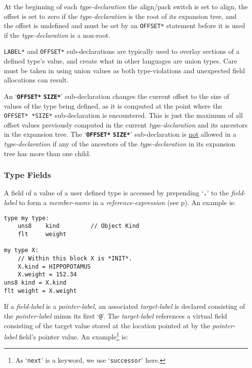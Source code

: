 \documentclass[12pt]{article}
\newcommand{\TT}[1]{{\tt \bfseries #1}}
\newcommand{\ttkey}[1]{{\tt \bfseries #1}}
\newcommand{\pagref}[1]{p\pageref{#1}}
\newenvironment{indpar}[1][0.3in]%
	{\begin{list}{}%
		     {\setlength{\itemsep}{0in}%
		      \setlength{\topsep}{0in}%
		      \setlength{\parsep}{1ex}%
		      \setlength{\labelwidth}{#1}%
		      \setlength{\leftmargin}{#1}%
		      \addtolength{\leftmargin}{\labelsep}}%
	 \item}%
	{\end{list}}
\begin{document}
At the beginning of each {\em type-declaration} the align/pack switch
is set to align, the offset is set to zero if the {\em type-declaration}
is the root of its expansion tree, and the offset is undefined and
must be set by an {\tt *OFFSET*} statement before
it is used if the {\em type-declaration} is a non-root.

{\tt *LABEL*} and {\tt *OFFSET*} sub-declarations are typically used
to overlay sections of a defined type's value, and create what in other
languages are union types.  Care must be taken in using union values
as both type-violations and unexpected field allocations can result.

An `\ttkey{*OFFSET*} \ttkey{*SIZE*}'\label{OFFSET-SIZE} sub-declaration
changes the current offset to the size of values of the type
being defined, as it is computed at the point where the {\tt *OFFSET* *SIZE*}
sub-declaration is encountered.  This is just the maximum of all
offset values previously computed in the current {\em type-declaration}
and its ancestors in the expansion tree.
The `\ttkey{*OFFSET*} \ttkey{*SIZE*}' sub-declaration
is \underline{not} allowed in a {\em type-declaration}
if any of the ancestors of the {\em type-declaration} in its expansion
tree has more than one child.

\subsubsection{Type Fields}

A field of a value of a user defined type is accessed by prepending
`\TT{.}' to the {\em field-label} to form a {\em member-name} in
a {\em reference-expression} (see \pagref{FIELD-SELECTION}).
An example is:

\begin{indpar}\begin{verbatim}
type my type:
    uns8    kind         // Object Kind
    flt     weight

my type X:
    // Within this block X is *INIT*.
    X.kind = HIPPOPOTAMUS
    X.weight = 152.34
uns8 kind = X.kind
flt weight = X.weight
\end{verbatim}\end{indpar}

If a {\em field-label} is a {\em pointer-label}, an
associated {\em target-label} is declared consisting of the
{\em pointer-label} minus its first `{\tt @}'.  The {\em target-label}
references a virtual field consisting of the target value stored
at the location pointed at by the {\em pointer-label} field's pointer value.
An example\footnote{As `{\tt next}' is a keyword, we use `{\tt successor}'
here.} is:
\end{document}
